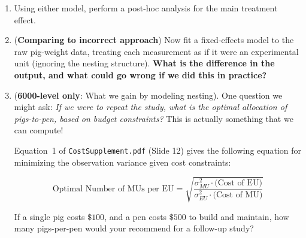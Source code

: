 \documentclass[10pt,twoside]{article}\usepackage[]{graphicx}\usepackage[dvipsnames,svgnames,table]{xcolor}
\begin{document}
\begin{enumerate}
\begin{enumerate}
\item Using either model, perform a post-hoc analysis for the main treatment effect. 

\item (\textbf{Comparing to incorrect approach}) Now fit a fixed-effects model to the raw pig-weight data, treating each measurement as if it were an experimental unit (ignoring the nesting structure).
\textbf{What is the difference in the output, and what could go wrong if we did this in practice?}

\item (\textbf{6000-level only}: What we gain by modeling nesting). One question we might ask: \emph{If we were to repeat the study, what is the optimal allocation of pigs-to-pen, based on budget constraints?} This is actually something that we can compute!

Equation~1 of \texttt{CostSupplement.pdf} (Slide 12) gives the following equation for minimizing the observation variance given cost constraints:

$$
\text{Optimal Number of MUs per EU} = \sqrt{ \frac{\sigma^2_{MU} \cdot \text{(Cost of EU)}}{\sigma^2_{EU} \cdot \text{(Cost of MU)} }}
$$

If a single pig costs $\$100$, and a pen costs $\$500$ to build and maintain, how many pigs-per-pen would your recommend for a follow-up study?

\end{enumerate}

\end{enumerate}
\end{document}

